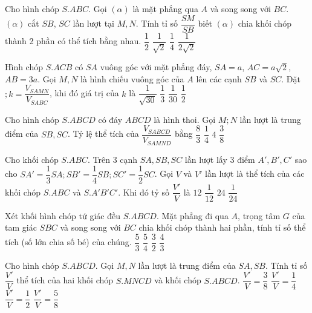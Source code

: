 \begin{ex}%
	Cho hình chóp $S.ABC$. Gọi $(\alpha)$ là mặt phẳng qua $A$ và song song với $BC$. $(\alpha)$ cắt $SB$, $SC$ lần lượt tại $M,N$. Tính tỉ số $\dfrac{SM}{SB}$ biết $(\alpha)$ chia khối chóp thành 2 phần có thể tích bằng nhau. 
	\choice
	{$\dfrac{1}{2}$}
	{\True $\dfrac{1}{\sqrt{2}}$}
	{$\dfrac{1}{4}$}
	{$\dfrac{1}{2\sqrt{2}}$}
\end{ex}

\begin{ex}%
	Hình chóp $S.ACB$ có $SA$ vuông góc với mặt phẳng đáy, $SA=a$, $AC=a\sqrt{2}$, $AB=3a$. Gọi $M,N$ là hình chiếu vuông góc của $A$ lên các cạnh $SB$ và $SC$. Đặt $;k=\dfrac{V_{SAMN}}{V_{SABC}}$, khi đó giá trị của $k$ là
	\choice
	{$\dfrac{1}{\sqrt{30}}$}
	{$\dfrac{1}{3}$}
	{\True $\dfrac{1}{30}$}
	{$\dfrac{1}{2}$}
\end{ex}

\begin{ex}%
	Cho hình chóp $S.ABCD$ có đáy $ABCD$ là hình thoi. Gọi $M;N$ lần lượt là trung điểm của $SB, SC$. Tỷ lệ thể tích của $\dfrac{V_{SABCD}}{V_{SAMND}}$ bằng
	\choice
	{\True $\dfrac{8}{3}$}
	{$\dfrac{1}{4}$}
	{$4$}
	{$\dfrac{3}{8}$}
\end{ex}

\begin{ex}%
	Cho khối chóp $S.ABC$. Trên 3 cạnh $SA, SB, SC$ lần lượt lấy 3 điểm $A', B', C'$ sao cho $SA'=\dfrac{1}{3}SA; SB'=\dfrac{1}{4}SB; SC'=\dfrac{1}{2}SC$. Gọi $V$ và $V'$ lần lượt là thể tích của các khối chóp $S.ABC$ và $S.A'B'C'$. Khi đó tỷ số $\dfrac{V'}{V}$ là
	\choice
	{$12$}
	{$\dfrac{1}{12}$}
	{$24$}
	{\True $\dfrac{1}{24}$}
\end{ex}

\begin{ex}%
	Xét khối hình chóp tứ giác đều $S.ABCD$. Mặt phẳng đi qua $A$, trọng tâm $G$ của tam giác $SBC$ và song song với $BC$ chia khối chóp thành hai phần, tính tỉ số thể tích (số lớn chia số bé) của chúng. 
	\choice
	{$\dfrac{5}{3}$}
	{\True $\dfrac{5}{4}$}
	{$\dfrac{3}{2}$}
	{$\dfrac{4}{3}$}
\end{ex}

\begin{ex}%
	Cho hình chóp $S.ABCD$. Gọi $M,N$ lần lượt là trung điểm của $SA,SB$. Tính tỉ số $\dfrac{V'}{V}$ thể tích của hai khối chóp $S.MNCD$ và khối chóp $S.ABCD$. 
	\choice
	{\True $\dfrac{V'}{V}=\dfrac{3}{8}$}
	{$\dfrac{V'}{V}=\dfrac{1}{4}$}
	{$\dfrac{V'}{V}=\dfrac{1}{2}$}
	{$\dfrac{V'}{V}=\dfrac{5}{8}$}
\end{ex}

